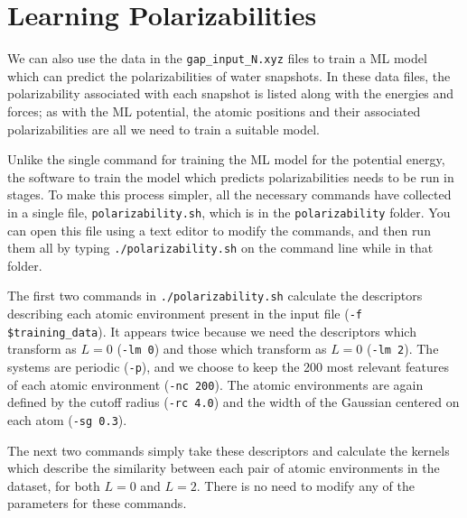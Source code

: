 \documentclass{article}
\begin{document}
\section{Learning Polarizabilities}

We can also use the data in the \verb|gap_input_N.xyz| files to train a ML model which can predict the polarizabilities of water snapshots. In these data files, the polarizability associated with each snapshot is listed along with the energies and forces; as with the ML potential, the atomic positions and their associated polarizabilities are all we need to train a suitable model.

Unlike the single command for training the ML model for the potential energy, the software to train the model which predicts polarizabilities needs to be run in stages. To make this process simpler, all the necessary commands have collected in a single file, \verb|polarizability.sh|, which is in the \verb|polarizability| folder. You can open this file using a text editor to modify the commands, and then run them all by typing \verb|./polarizability.sh| on the command line while in that folder.


The first two commands in \verb|./polarizability.sh| calculate the descriptors describing each atomic environment present in the input file (\verb|-f $training_data|). It appears twice because we need the descriptors which transform as $L=0$ (\verb|-lm 0|) and those which transform as $L=0$ (\verb|-lm 2|). The systems are periodic (\verb|-p|), and we choose to keep the 200 most relevant features of each atomic environment (\verb|-nc 200|). The atomic environments are again defined by the cutoff radius (\verb|-rc 4.0|) and the width of the Gaussian centered on each atom (\verb|-sg 0.3|).

The next two commands simply take these descriptors and calculate the kernels which describe the similarity between each pair of atomic environments in the dataset, for both $L=0$ and $L=2$. There is no need to modify any of the parameters for these commands.
\end{document}
